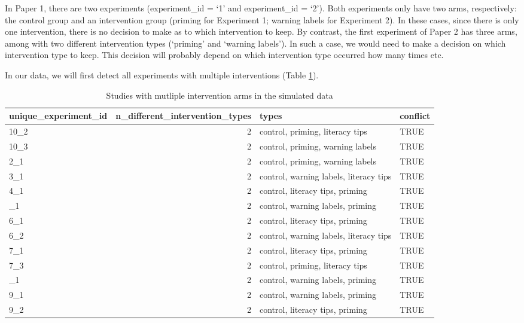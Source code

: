 \documentclass[
  man,mask,floatsintext]{apa6}
\begin{document}
In Paper 1, there are two experiments (experiment\_id = `1' and experiment\_id = `2'). Both experiments only have two arms, respectively: the control group and an intervention group (priming for Experiment 1; warning labels for Experiment 2). In these cases, since there is only one intervention, there is no decision to make as to which intervention to keep. By contrast, the first experiment of Paper 2 has three arms, among with two different intervention types (`priming' and `warning labels'). In such a case, we would need to make a decision on which intervention type to keep. This decision will probably depend on which intervention type occurred how many times etc.

In our data, we will first detect all experiments with multiple interventions (Table \ref{tab:intervention-selection-b}).

\begin{table}
\centering
\caption{\label{tab:intervention-selection-b}Studies with mutliple intervention arms in the simulated data}
\centering
\fontsize{10}{12}\selectfont
\begin{tabular}[t]{lrll}
\toprule
unique\_experiment\_id & n\_different\_intervention\_types & types & conflict\\
\midrule
10\_2 & 2 & control, priming, literacy tips & TRUE\\
10\_3 & 2 & control, priming, warning labels & TRUE\\
2\_1 & 2 & control, priming, warning labels & TRUE\\
3\_1 & 2 & control, warning labels, literacy tips & TRUE\\
4\_1 & 2 & control, literacy tips, priming & TRUE\\
\addlinespace
5\_1 & 2 & control, warning labels, priming & TRUE\\
6\_1 & 2 & control, literacy tips, priming & TRUE\\
6\_2 & 2 & control, warning labels, literacy tips & TRUE\\
7\_1 & 2 & control, literacy tips, priming & TRUE\\
7\_3 & 2 & control, priming, literacy tips & TRUE\\
\addlinespace
8\_1 & 2 & control, warning labels, priming & TRUE\\
9\_1 & 2 & control, warning labels, priming & TRUE\\
9\_2 & 2 & control, literacy tips, priming & TRUE\\
\bottomrule
\end{tabular}
\end{table}
\end{document}
